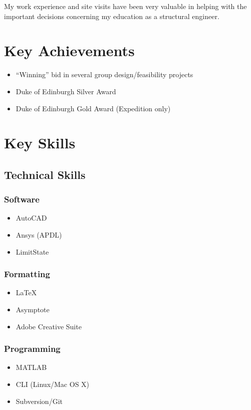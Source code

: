 \documentclass[oneside,a4paper]{article}
\begin{document}
My work experience and site visits have been very valuable in helping with the important decisions concerning my education as a structural engineer.

\section*{Key Achievements}

\begin{itemize}
\item ``Winning'' bid in several group design/feasibility projects
\item Duke of Edinburgh Silver Award
\item Duke of Edinburgh Gold Award (Expedition only)
\end{itemize}

\section*{Key Skills}

\subsection*{Technical Skills}
\begin{multicols}{3}

\subsubsection*{Software}
\begin{itemize}
\item AutoCAD
\item Ansys (APDL)
\item LimitState
\end{itemize}

\subsubsection*{Formatting}
\begin{itemize}
\item \LaTeX
\item Asymptote
\item Adobe Creative Suite
\end{itemize}

\subsubsection*{Programming}
\begin{itemize}
\item MATLAB
\item CLI (Linux/Mac OS X)
\item Subversion/Git
\end{itemize}

\end{multicols}
\end{document}
